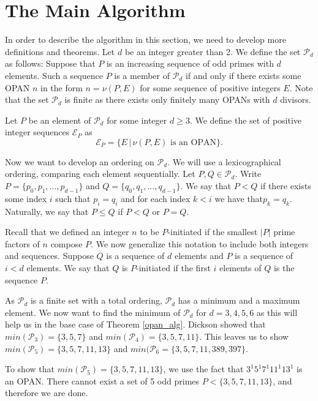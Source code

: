 \documentclass[../paper.tex]{subfiles}
\begin{document}
\section{The Main Algorithm}

In order to describe the algorithm in this section, we need to
develop more definitions and theorems. Let $d$ be an integer
greater than 2. We define the set $\mathcal{P}_d$ as follows: 
Suppose that $P$ is an increasing sequence of odd primes with 
$d$ elements. Such a sequence $P$ is a member of 
$\mathcal{P}_d$ if and only if there exists some OPAN $n$ in the 
form $n = \nu (P, E)$ for some sequence of positive integers $E$.
Note that the set $\mathcal{P}_d$ is finite as there exists only 
finitely many OPANs with $d$ divisors{\cite{dickson}}.

Let $P$ be an element of $\mathcal{P}_d$ for some integer $d \geq 
3$. We define the set of positive integer sequences 
$\mathcal{E}_P$ as 
%
$$\mathcal{E}_P = \{E\, |\, \nu(P, E) \text{ is an OPAN}\}.$$
%

Now we want to develop an ordering on $\mathcal{P}_d$. We will use
a lexicographical ordering, comparing each element sequentially.
Let $P, Q \in \mathcal{P}_d$. Write $P = \{p_0, p_1, ..., p_{d-1}\}$
and $Q = \{q_0, q_1, ..., q_{d-1}\}$. We say that $P < Q$ if 
there exists some index $i$ such that $p_i = q_i$ and for each
index $k < i$ we have that$p_k = q_k$. Naturally, we say that 
$P \leq Q$ if $P < Q$ or $P = Q$. 

Recall that we defined an integer $n$ to be $P$-initiated if the
smallest $|P|$ prime factors of $n$ compose $P$. We now generalize
this notation to include both integers and sequences. Suppose $Q$
is a sequence of $d$ elements and $P$ is a sequence of $i < d$
elements. We say that $Q$ is $P$-initiated if the first $i$
elements of $Q$ is the sequence $P$.

As $\mathcal{P}_d$ is a finite set with a total ordering,
$\mathcal{P}_d$ has a minimum and a maximum element. We now want
to find the minimum of $\mathcal{P}_d$ for $d = 3, 4, 5, 6$ as
this will help us in the base case of Theorem {\ref{opan_alg}}.
Dickson showed that $min(\mathcal{P}_3) = \{3, 5, 7\}$ and
$min(\mathcal{P}_4) = \{3, 5, 7, 11\}$. This leaves us to show
$min(\mathcal{P}_5) = \{3, 5, 7, 11, 13\}$ and $min(\mathcal{P}_6
= \{3, 5, 7, 11, 389, 397\}$.

To show that $min(\mathcal{P}_5) = \{3, 5, 7, 11, 13\}$, we use
the fact that $3^1 5^1 7^1 11^1 13^1$ is an OPAN. There cannot
exist a set of 5 odd primes $P < \{3, 5, 7, 11, 13\}$, and
therefore we are done.
\end{document}
